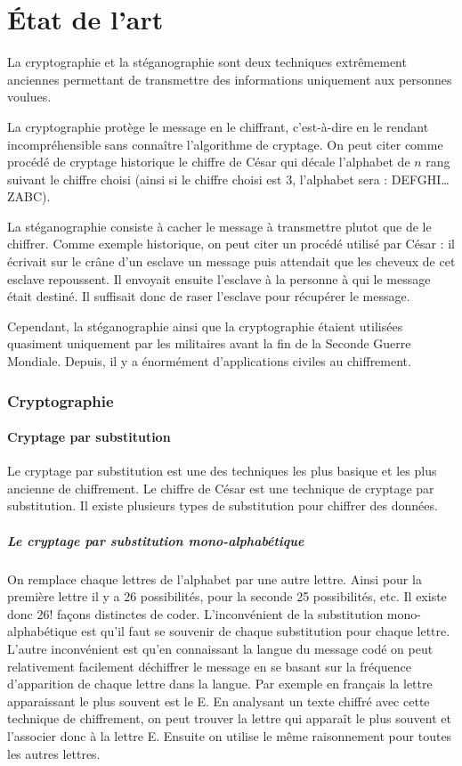 \documentclass[a4paper,12pt]{article}
\begin{document}
\part{\'{E}tat de l'art}
La cryptographie et la stéganographie sont deux techniques extrêmement anciennes permettant de transmettre des informations uniquement aux personnes voulues.

La cryptographie protège le message en le chiffrant, c'est-à-dire en le rendant incompréhensible sans connaître l'algorithme de cryptage. On peut citer comme procédé de cryptage historique le chiffre de César qui décale l'alphabet de $n$ rang suivant le chiffre choisi (ainsi si le chiffre choisi est 3, l'alphabet sera : DEFGHI\dots{}ZABC).

La stéganographie consiste à cacher le message à transmettre plutot que de le chiffrer. Comme exemple historique, on peut citer un procédé utilisé par César : il écrivait sur le crâne d'un esclave un message puis attendait que les cheveux de cet esclave repoussent. Il envoyait ensuite l'esclave à la personne à qui le message était destiné. Il suffisait donc de raser l'esclave pour récupérer le message.

Cependant, la stéganographie ainsi que la cryptographie étaient utilisées quasiment uniquement par les militaires avant la fin de la Seconde Guerre Mondiale. Depuis, il y a énormément d'applications civiles au chiffrement.

\section{Cryptographie}

\subsection{Cryptage par substitution}

Le cryptage par substitution est une des techniques les plus basique et les plus ancienne de chiffrement. Le chiffre de César est une technique de cryptage par substitution. Il existe plusieurs types de substitution pour chiffrer des données.

\subsubsection{Le cryptage par substitution mono-alphabétique}

On remplace chaque lettres de l'alphabet par une autre lettre. Ainsi pour la première lettre il y a 26 possibilités, pour la seconde 25 possibilités, etc. Il existe donc $26!$ façons distinctes de coder. L'inconvénient de la substitution mono-alphabétique est qu'il faut se souvenir de chaque substitution pour chaque lettre. L'autre inconvénient est qu'en connaissant la langue du message codé on peut relativement facilement déchiffrer le message en se basant sur la fréquence d'apparition de chaque lettre dans la langue. Par exemple en français la lettre apparaissant le plus souvent est le E. En analysant un texte chiffré avec cette technique de chiffrement, on peut trouver la lettre qui apparaît le plus souvent et l'associer donc à la lettre E. Ensuite on utilise le même raisonnement pour toutes les autres lettres.
\end{document}
